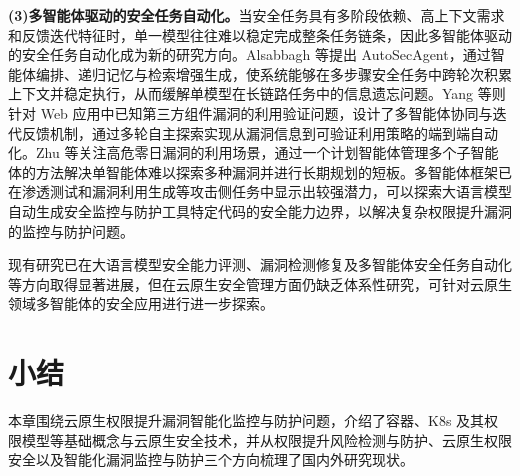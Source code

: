 \textbf{(3)多智能体驱动的安全任务自动化。}当安全任务具有多阶段依赖、高上下文需求和反馈迭代特征时，单一模型往往难以稳定完成整条任务链条，因此多智能体驱动的安全任务自动化成为新的研究方向。Alsabbagh 等\cite{alsabbagh2026autosecagent}提出 AutoSecAgent，通过智能体编排、递归记忆与检索增强生成，使系统能够在多步骤安全任务中跨轮次积累上下文并稳定执行，从而缓解单模型在长链路任务中的信息遗忘问题。Yang 等\cite{yang2026autoegexploitingknownthirdparty}则针对 Web 应用中已知第三方组件漏洞的利用验证问题，设计了多智能体协同与迭代反馈机制，通过多轮自主探索实现从漏洞信息到可验证利用策略的端到端自动化。Zhu 等\cite{zhu2025teamsllmagentsexploit}关注高危零日漏洞的利用场景，通过一个计划智能体管理多个子智能体的方法解决单智能体难以探索多种漏洞并进行长期规划的短板。多智能体框架已在渗透测试和漏洞利用生成等攻击侧任务中显示出较强潜力，可以探索大语言模型自动生成安全监控与防护工具特定代码的安全能力边界，以解决复杂权限提升漏洞的监控与防护问题。

现有研究已在大语言模型安全能力评测、漏洞检测修复及多智能体安全任务自动化等方向取得显著进展，但在云原生安全管理方面仍缺乏体系性研究，可针对云原生领域多智能体的安全应用进行进一步探索。


\section{小结}
本章围绕云原生权限提升漏洞智能化监控与防护问题，介绍了容器、K8s 及其权限模型等基础概念与云原生安全技术，并从权限提升风险检测与防护、云原生权限安全以及智能化漏洞监控与防护三个方向梳理了国内外研究现状。

